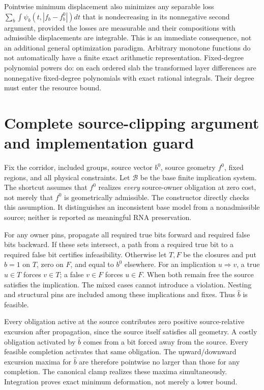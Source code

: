 \documentclass[10pt,letterpaper]{article}
\begin{document}
Pointwise minimum displacement also minimizes any separable loss $\sum_b\int\psi_b(t,|f_b-f_b^0|)dt$ that is nondecreasing in its nonnegative second argument, provided the losses are measurable and their compositions with admissible displacements are integrable. This is an immediate consequence, not an additional general optimization paradigm. Arbitrary monotone functions do not automatically have a finite exact arithmetic representation. Fixed-degree polynomial powers do: on each ordered slab the transformed layer differences are nonnegative fixed-degree polynomials with exact rational integrals. Their degree must enter the resource bound.


\section{Complete source-clipping argument and implementation guard}
Fix the corridor, included groups, source vector $b^0$, source geometry $f^0$, fixed regions, and all physical constraints. Let $\mathcal B$ be the base finite implication system. The shortcut assumes that $f^0$ realizes \emph{every} source-owner obligation at zero cost, not merely that $f^0$ is geometrically admissible. The constructor directly checks this assumption. It distinguishes an inconsistent base model from a nonadmissible source; neither is reported as meaningful RNA preservation.

For any owner pins, propagate all required true bits forward and required false bits backward. If these sets intersect, a path from a required true bit to a required false bit certifies infeasibility. Otherwise let $T,F$ be the closures and put $\widehat b=1$ on $T$, zero on $F$, and equal to $b^0$ elsewhere. For an implication $u\Rightarrow v$, a true $u\in T$ forces $v\in T$; a false $v\in F$ forces $u\in F$. When both remain free the source satisfies the implication. The mixed cases cannot introduce a violation. Nesting and structural pins are included among these implications and fixes. Thus $\widehat b$ is feasible.

Every obligation active at the source contributes zero positive source-relative excursion after propagation, since the source itself satisfies all geometry. A costly obligation activated by $\widehat b$ comes from a bit forced away from the source. Every feasible completion activates that same obligation. The upward/downward excursion maxima for $\widehat b$ are therefore pointwise no larger than those for any completion. The canonical clamp realizes these maxima simultaneously. Integration proves exact minimum deformation, not merely a lower bound.
\end{document}
